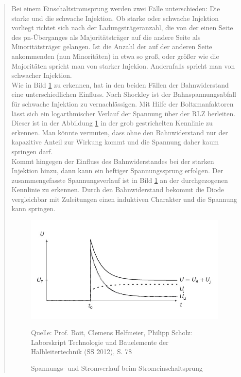 \begin{quote}
    Bei einem Einschaltstromsprung werden zwei Fälle unterschieden: Die starke
    und die schwache Injektion. Ob starke oder schwache Injektion vorliegt
    richtet sich nach der Ladungsträgeranzahl, die von der einen Seite des
    pn-Überganges als Majoritätsträger auf die andere Seite als Minoritätsträger
    gelangen. Ist die Anzahl der auf der anderen Seite ankommenden (nun
    Minoritäten) in etwa so groß, oder größer wie die Majoritäten spricht man von
    starker Injekion. Andernfalls spricht man von schwacher Injektion.\\
    Wie in Bild \ref{fig:Stromeinschalten} zu erkennen, hat in den beiden
    Fällen der Bahnwiderstand eine unterschiedlichen Einfluss. Nach Shockley ist der
    Bahnspannungsabfall für schwache Injektion zu vernachlässigen. Mit Hilfe der
    Boltzmanfaktoren lässt sich ein logarthmischer Verlauf der Spannung über der
    RLZ herleiten. Dieser ist in der Abbildung \ref{fig:Stromeinschalten} in der
    grob gestrichelten Kennlinie zu erkennen. Man könnte vermuten, dass ohne den
    Bahnwiderstand nur der kapazitive Anteil zur Wirkung kommt und die Spannung
    daher kaum springen darf.\\
    Kommt hingegen der Einfluss des Bahnwiderstandes bei der starken Injektion
    hinzu, dann kann ein heftiger Spannungssprung erfolgen. Der zusammengefasste
    Spannungsverlauf ist in Bild \ref{fig:Stromeinschalten} an der
    durchgezogenen Kennlinie zu erkennen. Durch den Bahnwiderstand bekommt die
    Diode vergleichbar mit Zuleitungen einen induktiven Charakter und die
    Spannung kann springen.

    \vspace{2em}

    \begin{figure}[H]
        \centering
        \includegraphics[scale=0.8]{./SchaltverhaltenBilder/Stromeinschalten.jpg}
        \caption{Spannungs- und Stromverlauf beim Stromeinschaltsprung}
             \begin{center}
                 \small Quelle: Prof. Boit, Clemens Helfmeier, Philipp Scholz: Laborskript Technologie und Bauelemente der Halbleitertechnik (SS 2012), S. 78
             \end{center}
        \label{fig:Stromeinschalten}
    \end{figure}


\end{quote}
